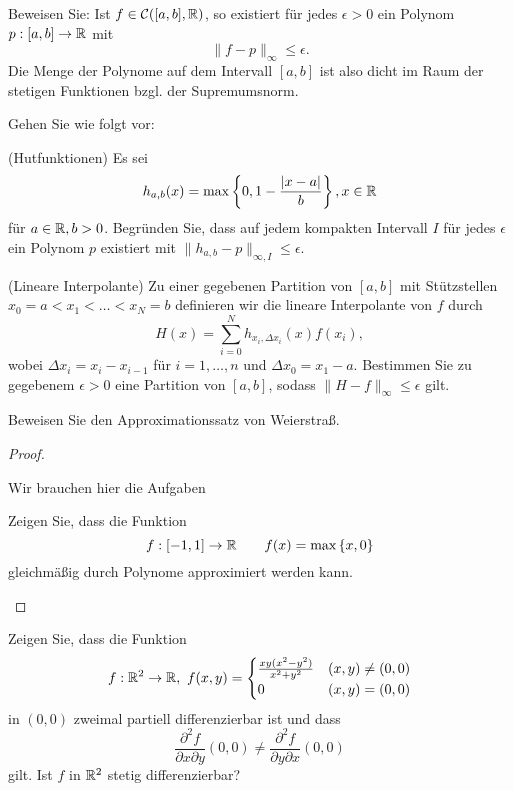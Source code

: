 \begin{Problem}
	Beweisen Sie: Ist $f\in \mathcal{C}([a,b],\mathbb{R})$, so existiert f\"{u}r jedes $\epsilon>0$ ein Polynom $p:[a,b]\to \mathbb{R}$ mit
	\[
	\|f-p\|_\infty\le\epsilon
	.\] 
	Die Menge der Polynome auf dem Intervall $[a,b]$ ist also dicht im Raum der stetigen Funktionen bzgl. der Supremumsnorm.

	Gehen Sie wie folgt vor:
	\begin{parts}
		\item (Hutfunktionen) Es sei
			\[
				h_{a,b}(x)=\max\left\{ 0,1-\frac{|x-a|}{b} \right\} ,x\in \mathbb{R}
			\]
			f\"{u}r $a\in \mathbb{R},b>0$. Begründen Sie, dass auf jedem kompakten Intervall $I$ f\"{u}r jedes $\epsilon$ ein Polynom $p$ existiert mit $\|h_{a,b}-p\|_{\infty,I}\le\epsilon$.
		\item (Lineare Interpolante) Zu einer gegebenen Partition von $[a,b]$ mit St\"{u}tzstellen $x_0=a<x_1<\dots<x_N=b$ definieren wir die lineare Interpolante von $f$ durch
			\[
				H(x)=\sum_{i=0}^N h_{x_i, \Delta x_i}(x)f(x_i)
			,\]
			wobei $\Delta x_i=x_i-x_{i-1}$ f\"{u}r $i=1,\dots, n$ und $\Delta x_0=x_1-a$. Bestimmen Sie zu gegebenem $\epsilon>0$ eine Partition von $[a,b]$, sodass $\|H-f\|_\infty\le\epsilon$ gilt.
		\item Beweisen Sie den Approximationssatz von Weierstraß. 
	\end{parts}
\end{Problem}
\begin{proof}
	\begin{parts}
	\item Wir brauchen hier die Aufgaben
		\begin{tcolorbox}
			Zeigen Sie, dass die Funktion
	\[f:[-1,1]\to\mathbb{R}\qquad f(x)=\text{max}\left\{ x,0 \right\} \]
	gleichmäßig durch Polynome approximiert werden kann.	
		\end{tcolorbox}
	\end{parts}
\end{proof}
\begin{Problem}
	Zeigen Sie, dass die Funktion
	\[
	f:\mathbb{R}^2\to\mathbb{R},~f(x,y)=\begin{cases}
		\frac{xy(x^2-y^2)}{x^2+y^2} & (x,y)\neq (0,0)\\
		0 & (x,y)=(0,0)
	\end{cases}
	\] 
	in $(0,0)$ zweimal partiell differenzierbar ist und dass
	\[
	\frac{\partial^2 f}{\partial x\partial y}(0,0)\neq \frac{\partial^2 f}{\partial y\partial x}(0,0)
\]
gilt. Ist $f$ in $\mathbb{R}^2$ stetig differenzierbar?
\end{Problem}

